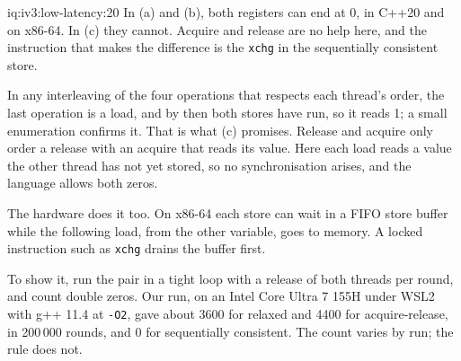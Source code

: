 \begin{solution}{iq:iv3:low-latency:20}
In (a) and (b), both registers can end at 0, in C++20 and on x86-64. In (c) they cannot. Acquire and release are no help here, and the instruction that makes the difference is the \texttt{xchg} in the sequentially consistent store.

In any interleaving of the four operations that respects each thread's order, the last operation is a load, and by then both stores have run, so it reads 1; a small enumeration confirms it. That is what (c) promises. Release and acquire only order a release with an acquire that reads its value. Here each load reads a value the other thread has not yet stored, so no synchronisation arises, and the language allows both zeros.

The hardware does it too. On x86-64 each store can wait in a FIFO store buffer while the following load, from the other variable, goes to memory. A locked instruction such as \texttt{xchg} drains the buffer first.

To show it, run the pair in a tight loop with a release of both threads per round, and count double zeros. Our run, on an Intel Core Ultra 7 155H under WSL2 with g++ 11.4 at \texttt{-O2}, gave about 3600 for relaxed and 4400 for acquire-release, in 200\,000 rounds, and 0 for sequentially consistent. The count varies by run; the rule does not.

\end{solution}

